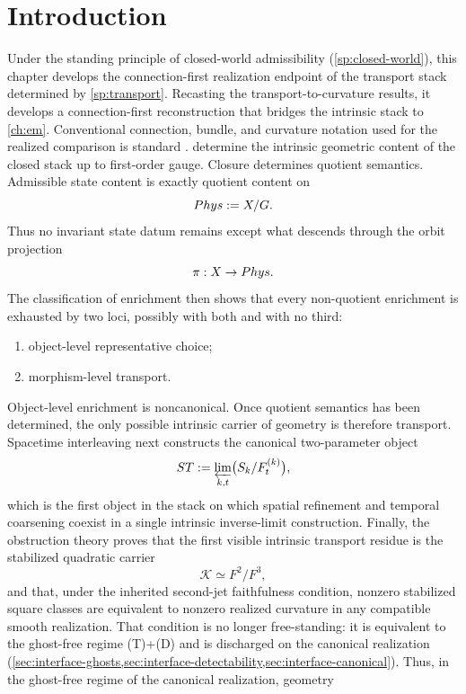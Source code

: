 \section{Introduction}
Under the standing principle of closed-world admissibility
(\cref{sp:closed-world}), this chapter develops the connection-first
realization endpoint of the transport stack determined by
\cref{sp:transport}.
Recasting the transport-to-curvature results, it develops a
connection-first reconstruction that bridges the intrinsic stack to
\cref{ch:em}.
Conventional connection, bundle, and curvature notation used for the
realized comparison is standard \cite{KobayashiNomizu1963,Nakahara2003}.
determine the intrinsic geometric content of the
closed stack up to first-order gauge.
Closure determines quotient semantics.  Admissible state content is exactly
quotient content on
\[
	Phys:=X/G.
\]
Thus no invariant state datum remains except what descends through the
orbit projection
\[
	\pi:X\to Phys.
\]
The classification of enrichment then shows that every
non-quotient enrichment is exhausted by two loci, possibly with both
and with no third:
\begin{enumerate}[label=\textup{(\alph*)}]
	\item
	      object-level representative choice;
	\item
	      morphism-level transport.
\end{enumerate}
Object-level enrichment is noncanonical. Once quotient semantics has
been determined, the only possible intrinsic carrier of geometry is
therefore transport.
Spacetime interleaving next constructs the canonical two-parameter
object
\[
	ST:=\varprojlim_{k,t}\bigl(S_k/F_t^{(k)}\bigr),
\]
which is the first object in the stack on which spatial refinement and
temporal coarsening coexist in a single intrinsic inverse-limit
construction.
Finally, the obstruction theory proves that the first visible intrinsic
transport residue is the stabilized quadratic carrier
\[
	\mathcal K\simeq F^2/F^3,
\]
and that, under the inherited second-jet faithfulness condition,
nonzero stabilized square classes are equivalent to nonzero realized
curvature in any compatible smooth realization.
That condition is no longer free-standing: it is equivalent to the
ghost-free regime \textup{(T)}+\textup{(D)} and is discharged on the
canonical realization
(\cref{sec:interface-ghosts,sec:interface-detectability,sec:interface-canonical}).
Thus, in the ghost-free regime of the canonical realization, geometry
